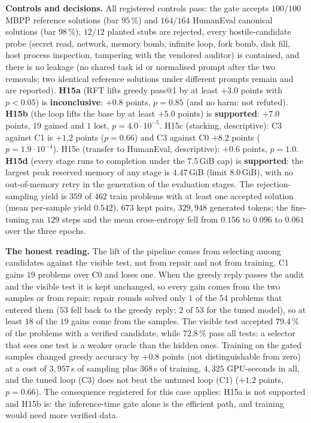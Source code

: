 \documentclass[11pt,a4paper]{article}
\begin{document}
\textbf{Controls and decisions.} All registered controls pass: the gate accepts $100/100$ MBPP reference solutions (bar $95\,\%$) and $164/164$ HumanEval canonical solutions (bar $98\,\%$), $12/12$ planted stubs are rejected, every hostile-candidate probe (secret read, network, memory bomb, infinite loop, fork bomb, disk fill, host process inspection, tampering with the vendored auditor) is contained, and there is no leakage (no shared task id or normalised prompt after the two removals; two identical reference solutions under different prompts remain and are reported). \textbf{H15a} (RFT lifts greedy pass@1 by at least $+3.0$ points with $p<0.05$) is \textbf{inconclusive}: $+0.8$ points, $p=0.85$ (and no harm: not refuted). \textbf{H15b} (the loop lifts the base by at least $+5.0$ points) is \textbf{supported}: $+7.0$ points, $19$ gained and $1$ lost, $p=4.0\cdot10^{-5}$. H15c (stacking, descriptive): C3 against C1 is $+1.2$ points ($p=0.66$) and C3 against C0 $+8.2$ points ($p=1.9\cdot10^{-4}$). H15e (transfer to HumanEval, descriptive): $+0.6$ points, $p=1.0$. \textbf{H15d} (every stage runs to completion under the $7.5$\,GiB cap) is \textbf{supported}: the largest peak reserved memory of any stage is $4.47$\,GiB (limit $8.0$\,GiB), with no out-of-memory retry in the generation of the evaluation stages. The rejection-sampling yield is $359$ of $462$ train problems with at least one accepted solution (mean per-sample yield $0.542$), $673$ kept pairs, $329{,}948$ generated tokens; the fine-tuning ran $129$ steps and the mean cross-entropy fell from $0.156$ to $0.096$ to $0.061$ over the three epochs.

\textbf{The honest reading.} The lift of the pipeline comes from selecting among candidates against the visible test, not from repair and not from training. C1 gains $19$ problems over C0 and loses one. When the greedy reply passes the audit and the visible test it is kept unchanged, so every gain comes from the two samples or from repair; repair rounds solved only $1$ of the $54$ problems that entered them ($53$ fell back to the greedy reply; $2$ of $53$ for the tuned model), so at least $18$ of the $19$ gains come from the samples. The visible test accepted $79.4\,\%$ of the problems with a verified candidate, while $72.8\,\%$ pass all tests: a selector that sees one test is a weaker oracle than the hidden ones. Training on the gated samples changed greedy accuracy by $+0.8$ points (not distinguishable from zero) at a cost of $3{,}957$\,s of sampling plus $368$\,s of training, $4{,}325$ GPU-seconds in all, and the tuned loop (C3) does not beat the untuned loop (C1) ($+1.2$ points, $p=0.66$). The consequence registered for this case applies: H15a is not supported and H15b is: the inference-time gate alone is the efficient path, and training would need more verified data.
\end{document}
